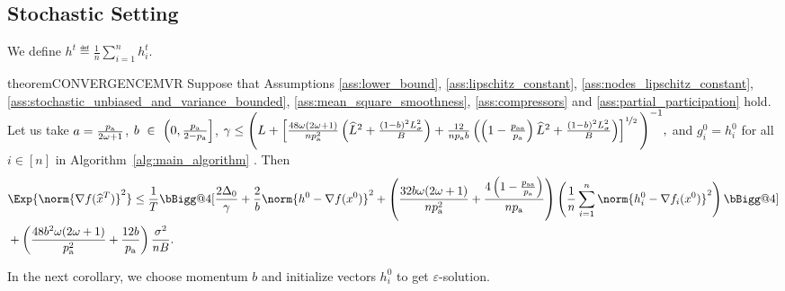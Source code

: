 \documentclass{article}
\makeatletter
\newcommand{\algorithmname}{DASHA-PP}
\newcommand*{\probavailable}{\ensuremath{p_{\textnormal{a}}}}
\newcommand*{\probpairaa}{\ensuremath{p_{\textnormal{aa}}}}
\newcommand{\vast}{\bBigg@{4}}
\makeatother
\begin{document}
\subsection{Stochastic Setting}

\label{sec:stochastic_setting}

We define $h^t \eqdef \frac{1}{n}\sum_{i=1}^n h^t_i$.

\begin{restatable}{theorem}{CONVERGENCEMVR}
  \label{theorem:stochastic}
  Suppose that Assumptions \ref{ass:lower_bound}, \ref{ass:lipschitz_constant}, \ref{ass:nodes_lipschitz_constant}, \ref{ass:stochastic_unbiased_and_variance_bounded}, \ref{ass:mean_square_smoothness}, \ref{ass:compressors} and \ref{ass:partial_participation} hold. Let us take $a = \frac{\probavailable}{2\omega + 1}$, $b~\in~\left(0, \frac{\probavailable}{2 - \probavailable}\right]$, 
  {\scriptsize $\gamma \leq \Bigg(L + \left[\frac{48 \omega (2 \omega + 1)}{n \probavailable^2} \left(\widehat{L}^2 + \frac{(1 - b)^2 L_{\sigma}^2}{B}\right) + \frac{12}{n \probavailable b}\left(\left(1 - \frac{\probpairaa}{\probavailable}\right) \widehat{L}^2 + \frac{(1 - b)^2 L_{\sigma}^2}{B}\right)\right]^{\nicefrac{1}{2}}\Bigg)^{-1},$}
  and $g^{0}_i = h^{0}_i$ for all $i \in [n]$
  in Algorithm~\ref{alg:main_algorithm} \algname{(\algorithmname-MVR)}.
  Then 
{\scriptsize\begin{align*}
  &\Exp{\norm{\nabla f(\widehat{x}^T)}^2} \leq \frac{1}{T}\vast[\frac{2 \Delta_0}{\gamma} + \frac{2}{b} \norm{h^{0} - \nabla f(x^{0})}^2 + \left(\frac{32 b \omega (2 \omega + 1)}{n \probavailable^2} + \frac{4 \left(1 - \frac{\probpairaa}{\probavailable}\right)}{n \probavailable}\right)\left(\frac{1}{n}\sum_{i=1}^n\norm{h^{0}_i - \nabla f_i(x^{0})}^2\right)\vast] \\
  &+ \left(\frac{48 b^2 \omega (2 \omega + 1)}{\probavailable^2} + \frac{12 b}{\probavailable}\right) \frac{\sigma^2}{n B}.
\end{align*}}
\end{restatable}

In the next corollary, we choose momentum $b$ and initialize vectors $h^{0}_i$ to get $\varepsilon$-solution. 
\end{document}
